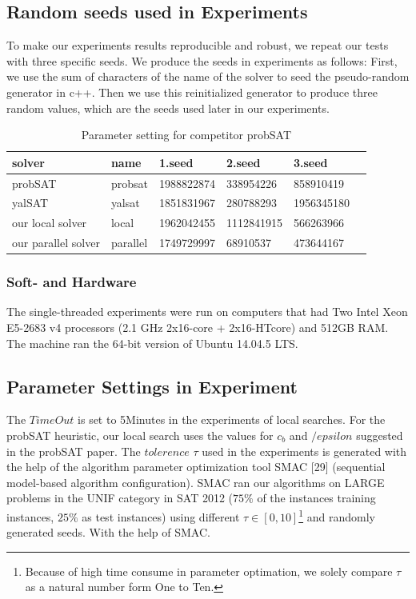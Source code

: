 \documentclass[12pt,a4paper,twoside]{scrartcl}
\numberwithin{equation}{section}
\begin{document}
\subsection{Random seeds used in Experiments}
To make our experiments results reproducible and robust, we repeat our tests with three specific seeds. We produce the seeds in experiments as follows: First, we use the sum of characters of the name of the solver to seed the pseudo-random generator in c++.  Then we use this reinitialized generator to produce three random values, which are the seeds used later in our experiments. 
\begin{table}[h!]
\begin{center}
    \begin{tabular}{|l|l|l|l|l|p{1cm}|}
\hline 
    solver&name&1.seed&2.seed&3.seed \\ \hline
	probSAT&probsat&1988822874&338954226 &858910419 \\ \hline
	yalSAT &yalsat&1851831967&280788293&1956345180 \\ \hline
	our local solver & local&1962042455&1112841915&566263966 \\ \hline
	our parallel solver & parallel &1749729997& 68910537& 473644167 \\ \hline
	
\end{tabular}
\caption[probSAT]{Parameter setting for competitor probSAT}
\end{center}
\end{table} 
\subsubsection{Soft- and Hardware}
The single-threaded experiments were run on computers that had Two Intel Xeon E5-2683 v4 processors  (2.1 GHz 2x16-core + 2x16-HTcore) and 512GB RAM. The machine ran the 64-bit version
of  Ubuntu 14.04.5 LTS. 
\subsection{Parameter Settings in Experiment}
The $TimeOut$ is set to 5Minutes in the experiments of local searches.  For the probSAT heuristic, our local search uses the values for $c_b$ and $/epsilon$ suggested in the probSAT paper.  The $tolerence$ $ \tau$ used in the experiments is generated with the help of the algorithm parameter optimization tool SMAC [29] (sequential model-based algorithm configuration). SMAC ran our algorithms on LARGE problems in the UNIF category in SAT 2012 ($75\%$ of the instances training instances,  $25\%$ as test instances) using different   $ \tau \in [0, 10]$\footnote{Because of high time consume in parameter optimation, we solely compare $\tau$  as a natural number form One to Ten.}  and randomly generated seeds. With the help of SMAC.
\end{document}
